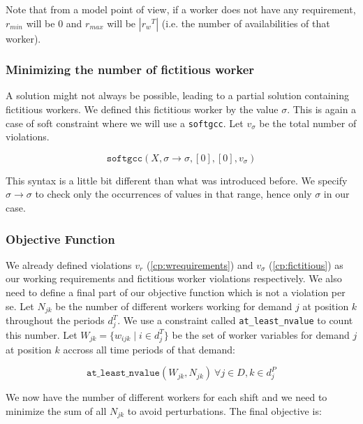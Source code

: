 \documentclass[../../thesis.tex]{subfiles}
\begin{document}
Note that from a model point of view, if a worker does not have any requirement, $r_{min}$ will be 0 and $r_{max}$ will be $|{r_w}^T| $ (i.e. the number of availabilities of that worker).

\subsubsection{Minimizing the number of fictitious worker}

A solution might not always be possible, leading to a partial solution containing fictitious workers.
We defined this fictitious worker by the value $\sigma$. This is again a case of soft constraint where 
we will use a \texttt{softgcc}. Let $v_{\sigma}$ be the total number of violations.


\begin{equation}
  \texttt{softgcc}(X, \sigma \rightarrow \sigma, [0], [0], v_{\sigma}) \label{cp:fictitious}
\end{equation}

This syntax is a little bit different than what was introduced before. We specify $\sigma \rightarrow \sigma$ to check only the occurrences of values 
in that range, hence only $\sigma$ in our case.


\subsubsection{Objective Function}

We already defined violations $v_r$ (\ref{cp:wrequirements}) and $v_{\sigma}$ (\ref{cp:fictitious}) as our working requirements and fictitious worker violations respectively.
We also need to define a final part of our objective function which is not a violation per se. Let $N_{jk}$ be the number 
of different workers working for demand $j$ at position $k$ throughout the periods $d_j^T$. We use a 
constraint called \texttt{at\_least\_nvalue} to count this number.
Let  $W_{jk} = \{ w_{ijk} \mid i \in d^T_j \}$ be the set of worker variables for demand $j$ at position $k$ accross all time periods of that demand:

\begin{equation}
  \texttt{at\_least\_nvalue}(W_{jk}, N_{jk}) \ \forall j \in D, k \in d^P_j
\end{equation}

We now have the number of different workers for each shift and we need to minimize the sum of all $N_{jk}$ to avoid perturbations.
The final objective is:
\end{document}

